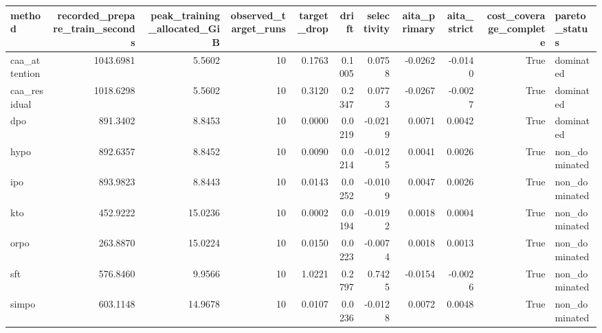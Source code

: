 \begin{tabular}{lrrrrrrrrrl}
\toprule
method & recorded\_prepare\_train\_seconds & peak\_training\_allocated\_GiB & observed\_target\_runs & target\_drop & drift & selectivity & aita\_primary & aita\_strict & cost\_coverage\_complete & pareto\_status \\
\midrule
caa\_attention & 1043.6981 & 5.5602 & 10 & 0.1763 & 0.1005 & 0.0758 & -0.0262 & -0.0140 & True & dominated \\
caa\_residual & 1018.6298 & 5.5602 & 10 & 0.3120 & 0.2347 & 0.0773 & -0.0267 & -0.0027 & True & dominated \\
dpo & 891.3402 & 8.8453 & 10 & 0.0000 & 0.0219 & -0.0219 & 0.0071 & 0.0042 & True & dominated \\
hypo & 892.6357 & 8.8452 & 10 & 0.0090 & 0.0214 & -0.0125 & 0.0041 & 0.0026 & True & non\_dominated \\
ipo & 893.9823 & 8.8443 & 10 & 0.0143 & 0.0252 & -0.0109 & 0.0047 & 0.0026 & True & non\_dominated \\
kto & 452.9222 & 15.0236 & 10 & 0.0002 & 0.0194 & -0.0192 & 0.0018 & 0.0004 & True & non\_dominated \\
orpo & 263.8870 & 15.0224 & 10 & 0.0150 & 0.0223 & -0.0074 & 0.0018 & 0.0013 & True & non\_dominated \\
sft & 576.8460 & 9.9566 & 10 & 1.0221 & 0.2797 & 0.7425 & -0.0154 & -0.0026 & True & non\_dominated \\
simpo & 603.1148 & 14.9678 & 10 & 0.0107 & 0.0236 & -0.0128 & 0.0072 & 0.0048 & True & non\_dominated \\
\bottomrule
\end{tabular}
